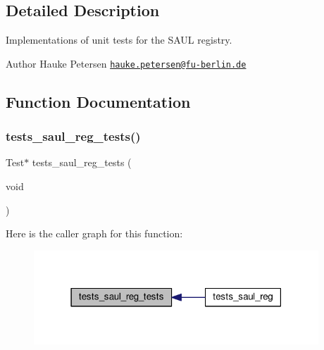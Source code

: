 \subsection{Detailed Description}
Implementations of unit tests for the S\+A\+UL registry. 

\begin{DoxyAuthor}{Author}
Hauke Petersen \href{mailto:hauke.petersen@fu-berlin.de}{\tt hauke.\+petersen@fu-\/berlin.\+de} 
\end{DoxyAuthor}


\subsection{Function Documentation}
\mbox{\label{tests-saul__reg_8c_aa746168012175a7671e4e100b88de739}} 
\subsubsection{\texorpdfstring{tests\+\_\+saul\+\_\+reg\+\_\+tests()}{tests\_saul\_reg\_tests()}}
{\footnotesize\ttfamily Test$\ast$ tests\+\_\+saul\+\_\+reg\+\_\+tests (\begin{DoxyParamCaption}\item[{void}]{ }\end{DoxyParamCaption})}

Here is the caller graph for this function\+:
\nopagebreak
\begin{figure}[H]
\begin{center}
\leavevmode
\includegraphics[width=303pt]{tests-saul__reg_8c_aa746168012175a7671e4e100b88de739_icgraph}
\end{center}
\end{figure}
